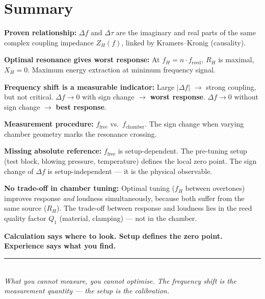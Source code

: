 \documentclass[11pt,a4paper]{article}
\begin{document}
\section{Summary}

\begin{keybox}
\textbf{Proven relationship:} $\Delta f$ and $\Delta\tau$ are the imaginary and real parts of the same complex coupling impedance $Z_H(f)$, linked by Kramers--Kronig (causality).

\textbf{Optimal resonance gives worst response:} At $f_H = n \cdot f_\text{reed}$, $R_H$ is maximal, $X_H = 0$. Maximum energy extraction at minimum frequency signal.

\textbf{Frequency shift is a measurable indicator:}
Large $|\Delta f|$ $\to$ strong coupling, but not critical.
$\Delta f \to 0$ with sign change $\to$ \textbf{worst response}.
$\Delta f \to 0$ without sign change $\to$ \textbf{best response}.

\textbf{Measurement procedure:} $f_\text{free}$ vs.\ $f_\text{chamber}$. The sign change when varying chamber geometry marks the resonance crossing.

\textbf{Missing absolute reference:} $f_\text{free}$ is setup-dependent. The pre-tuning setup (test block, blowing pressure, temperature) defines the local zero point. The sign change of $\Delta f$ is setup-independent --- it is the physical observable.

\textbf{No trade-off in chamber tuning:} Optimal tuning ($f_H$ between overtones) improves response \textit{and} loudness simultaneously, because both suffer from the same source ($R_H$). The trade-off between response and loudness lies in the reed quality factor $Q_1$ (material, clamping) --- not in the chamber.

\textbf{Calculation says where to look. Setup defines the zero point. Experience says what you find.}
\end{keybox}

\vspace{3mm}
\begin{center}
\textcolor{accentred}{\rule{0.6\textwidth}{1pt}}\\[4pt]
{\small\itshape What you cannot measure, you cannot optimise. The frequency shift is the measurement quantity --- the setup is the calibration.}
\end{center}
\end{document}
